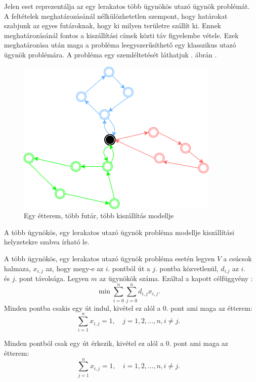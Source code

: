 

Jelen eset reprezentálja az egy lerakatos több ügynökös utazó ügynök problémát. A feltételek meghatározásánál nélkülözhetetlen szempont, hogy határokat szabjunk az egyes futároknak, hogy ki milyen területre szállít ki. Ennek meghatározásánál fontos a kiszállítási címek közti táv figyelembe vétele. Ezek meghatározása után maga a probléma leegyszerűsíthető egy klasszikus utazó ügynök problémára.
A probléma egy szemléltetését láthatjuk . ábrán \cite{Diagrams.net}.

\begin{figure}[h!]
\centering
\includegraphics[scale=0.7]{images/Onedepotmtsp.png}
\caption{Egy étterem, több futár, több kiszállítás modellje}
\label{fig:model4}
\end{figure}


A több ügynökös, egy lerakatos utazó ügynök probléma modellje kiszállítási helyzetekre szabva írható le.

A több ügynökös, egy lerakatos utazó ügynök probléma esetén legyen $V$ a csúcsok halmaza, $x_{i,j}$ az, hogy megy-e az $i.$ pontból út a $j.$ pontba közvetlenül, $d_{i.j}$ az $i.$ és $j.$ pont távolsága. Legyen $m$ az ügynökök száma. Ezáltal a kapott célfüggvény \cite{MTSP}: 
\[
\displaystyle
\min \sum_{i=0}^n \sum_{j=0}^n d_{i,j} x_{i,j}.
\]
Minden pontba csakis egy út indul, kivétel ez alól a 0. pont ami maga az étterem:
\[
\displaystyle
\sum_{i=1}^n x_{i,j} = 1, \quad j = 1, 2, \ldots, n, i \neq j.
\]

Minden pontból csak egy út érkezik, kivétel ez alól a 0. pont ami maga az étterem:
\[
\displaystyle
\sum_{j=1}^n x_{i,j} = 1, \quad i = 1, 2, \ldots, n, i \neq j.
\]

